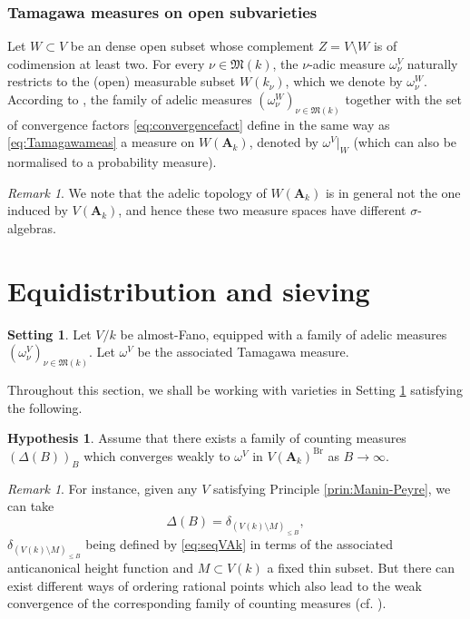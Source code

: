 \documentclass[11pt,letterpaper]{amsart}
\newcommand{\RA}{{\mathbf {A}}}
\theoremstyle{plain}
\numberwithin{equation}{section}
\theoremstyle{definition}
\newtheorem{hypothesis}[theorem]{Setting}
\newtheorem{hypothesis1}[theorem]{Hypothesis}
\theoremstyle{remark}
\newtheorem{remark}[theorem]{Remark}
\begin{document}
\subsubsection{Tamagawa measures on open subvarieties}
Let $W\subset V$ be an dense open subset whose complement $Z=V\setminus W$ is of codimension at least two. For every $\nu\in\mathfrak{M}(k)$, the $\nu$-adic measure $\omega_\nu^V$ naturally restricts to the (open) measurable subset $W(k_\nu)$, which we denote by $\omega_\nu^W$.
According to \cite[Proposition 2.1]{Cao-Huang2}, the family of adelic measures $(\omega_\nu^W)_{\nu\in\mathfrak{M}(k)}$ together with the set of convergence factors \eqref{eq:convergencefact} define in the same way as \eqref{eq:Tamagawameas} a measure on $W(\RA_k)$, denoted by $\omega^V|_W$ (which can also be normalised to a probability measure).
\begin{remark}
	We note that the adelic topology of $W(\RA_k)$ is in general not the one induced by $V(\RA_k)$, and hence these two measure spaces have different $\sigma$-algebras.
\end{remark}


\section{Equidistribution and sieving}\label{se:equidistgeomsieve}
\begin{hypothesis}\label{hyp:almost-Fano}
	Let $V/k$ be almost-Fano, equipped with a family of adelic measures $(\omega_\nu^V)_{\nu\in\mathfrak{M}(k)}$. Let $\omega^V$ be the associated Tamagawa measure. 
\end{hypothesis} 
Throughout this section, we shall be working with varieties in Setting \ref{hyp:almost-Fano} satisfying the following.
\begin{hypothesis1}\label{hyp:deltaB}
	Assume that there exists a family of counting measures $(\Delta(B))_B$
	which converges weakly to $\omega^V$ in $V(\RA_k)^{\operatorname{Br}}$ as $B\to\infty$.
\end{hypothesis1}
\begin{remark}
	For instance, given any $V$ satisfying Principle \ref{prin:Manin-Peyre}, we can take $$\Delta(B)=\delta_{(V(k)\setminus M)_{\leqslant B}},$$ $\delta_{(V(k)\setminus M)_{\leqslant B}}$ being defined by \eqref{eq:seqVAk} in terms of the associated anticanonical height function and $M\subset V(k)$ a fixed thin subset.  But there can exist different ways of ordering rational points which also lead to the weak convergence of the corresponding family of counting measures (cf. \cite[\S4]{Peyre}).
\end{remark}
\end{document}
